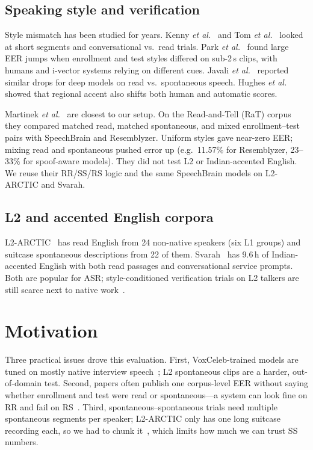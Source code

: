 \documentclass[cameraready]{Interspeech}
\begin{document}
\subsection{Speaking style and verification}

Style mismatch has been studied for years. Kenny \textit{et al.}~\cite{kenny2014style} and Tom \textit{et al.}~\cite{tom2010style} looked at short segments and conversational vs.\ read trials. Park \textit{et al.}~\cite{park2018style} found large EER jumps when enrollment and test styles differed on sub-2\,s clips, with humans and i-vector systems relying on different cues. Javali \textit{et al.}~\cite{javali2024style} reported similar drops for deep models on read vs.\ spontaneous speech. Hughes \textit{et al.}~\cite{hughes2025voice} showed that regional accent also shifts both human and automatic scores.

Martinek \textit{et al.}~\cite{martinek2025read} are closest to our setup. On the Read-and-Tell (RaT) corpus they compared matched read, matched spontaneous, and mixed enrollment--test pairs with SpeechBrain and Resemblyzer. Uniform styles gave near-zero EER; mixing read and spontaneous pushed error up (e.g.\ 11.57\% for Resemblyzer, 23--33\% for spoof-aware models). They did not test L2 or Indian-accented English. We reuse their RR/SS/RS logic and the same SpeechBrain models on L2-ARCTIC and Svarah.

\subsection{L2 and accented English corpora}

L2-ARCTIC~\cite{zhao2018l2arctic} has read English from 24 non-native speakers (six L1 groups) and suitcase spontaneous descriptions from 22 of them. Svarah~\cite{javed2023svarah} has 9.6\,h of Indian-accented English with both read passages and conversational service prompts. Both are popular for ASR; style-conditioned verification trials on L2 talkers are still scarce next to native work~\cite{martinek2025read,park2018style}.

\section{Motivation}
\label{sec:pitfalls}

Three practical issues drove this evaluation. First, VoxCeleb-trained models are tuned on mostly native interview speech~\cite{chung2018voxceleb,desplanques2020ecapa}; L2 spontaneous clips are a harder, out-of-domain test. Second, papers often publish one corpus-level EER without saying whether enrollment and test were read or spontaneous---a system can look fine on RR and fail on RS~\cite{tom2010style,martinek2025read}. Third, spontaneous--spontaneous trials need multiple spontaneous segments per speaker; L2-ARCTIC only has one long suitcase recording each, so we had to chunk it~\cite{zhao2018l2arctic}, which limits how much we can trust SS numbers.
\end{document}
